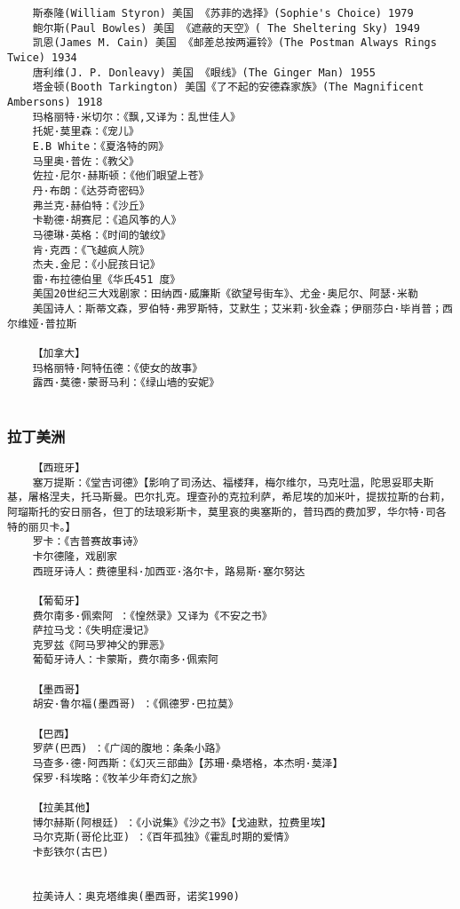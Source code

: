 \documentclass[UTF8]{../../RepresentationUniverse}
\begin{document}
\begin{lstlisting}
    斯泰隆(William Styron) 美国 《苏菲的选择》(Sophie's Choice) 1979
    鲍尔斯(Paul Bowles) 美国 《遮蔽的天空》( The Sheltering Sky) 1949
    凯恩(James M. Cain) 美国 《邮差总按两遍铃》(The Postman Always Rings Twice) 1934
    唐利维(J. P. Donleavy) 美国 《眼线》(The Ginger Man) 1955
    塔金顿(Booth Tarkington) 美国《了不起的安德森家族》(The Magnificent Ambersons) 1918
    玛格丽特·米切尔：《飘,又译为：乱世佳人》
    托妮·莫里森：《宠儿》
    E.B White：《夏洛特的网》
    马里奥·普佐：《教父》
    佐拉·尼尔·赫斯顿：《他们眼望上苍》
    丹·布朗：《达芬奇密码》
    弗兰克·赫伯特：《沙丘》
    卡勒德·胡赛尼：《追风筝的人》
    马德琳·英格：《时间的皱纹》
    肯·克西：《飞越疯人院》
    杰夫.金尼：《小屁孩日记》
    雷·布拉德伯里《华氏451 度》
    美国20世纪三大戏剧家：田纳西·威廉斯《欲望号街车》、尤金·奥尼尔、阿瑟·米勒
    美国诗人：斯蒂文森，罗伯特·弗罗斯特，艾默生；艾米莉·狄金森；伊丽莎白·毕肖普；西尔维娅·普拉斯

    【加拿大】
    玛格丽特·阿特伍德：《使女的故事》
    露西·莫德·蒙哥马利：《绿山墙的安妮》
    
\end{lstlisting}




\subsubsection{拉丁美洲}
\begin{lstlisting}
    【西班牙】
    塞万提斯：《堂吉诃德》【影响了司汤达、福楼拜，梅尔维尔，马克吐温，陀思妥耶夫斯基，屠格涅夫，托马斯曼。巴尔扎克。理查孙的克拉利萨，希尼埃的加米叶，提拔拉斯的台莉，阿瑠斯托的安日丽各，但丁的珐琅彩斯卡，莫里哀的奥塞斯的，普玛西的费加罗，华尔特·司各特的丽贝卡。】
    罗卡：《吉普赛故事诗》
    卡尔德隆，戏剧家
    西班牙诗人：费德里科·加西亚·洛尔卡，路易斯·塞尔努达
    
    【葡萄牙】
    费尔南多·佩索阿 ：《惶然录》又译为《不安之书》
    萨拉马戈：《失明症漫记》
    克罗兹《阿马罗神父的罪恶》
    葡萄牙诗人：卡蒙斯，费尔南多·佩索阿

    【墨西哥】
    胡安·鲁尔福(墨西哥) ：《佩德罗·巴拉莫》

    【巴西】
    罗萨(巴西) ：《广阔的腹地：条条小路》
    马查多·德·阿西斯：《幻灭三部曲》【苏珊·桑塔格，本杰明·莫泽】
    保罗·科埃略：《牧羊少年奇幻之旅》

    【拉美其他】
    博尔赫斯(阿根廷) ：《小说集》《沙之书》【戈迪默，拉费里埃】
    马尔克斯(哥伦比亚) ：《百年孤独》《霍乱时期的爱情》
    卡彭铁尔(古巴) 


    拉美诗人：奥克塔维奥(墨西哥，诺奖1990) 
\end{lstlisting}
\end{document}
